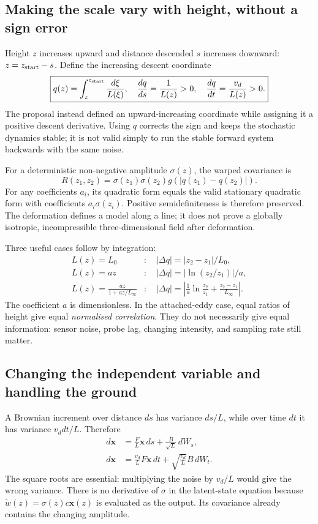 \documentclass[11pt,a4paper]{article}
\numberwithin{equation}{section}
\begin{document}
\subsection{Making the scale vary with height, without a sign error}
Height $z$ increases upward and distance descended $s$ increases downward: $z=z_{\rm start}-s$. Define the increasing descent coordinate
\begin{equation}
 \boxed{q(z)=\int_z^{z_{\rm start}}\frac{d\xi}{L(\xi)},\quad
 \frac{dq}{ds}=\frac1{L(z)}>0,\quad \frac{dq}{dt}=\frac{v_d}{L(z)}>0.}
\end{equation}
The proposal instead defined an upward-increasing coordinate while assigning it a positive descent derivative. Using $q$ corrects the sign and keeps the stochastic dynamics stable; it is not valid simply to run the stable forward system backwards with the same noise.

For a deterministic non-negative amplitude $\sigma(z)$, the warped covariance is
\begin{equation}
 R(z_1,z_2)=\sigma(z_1)\sigma(z_2)g(|q(z_1)-q(z_2)|).
\end{equation}
For any coefficients $a_i$, its quadratic form equals the valid stationary quadratic form with coefficients $a_i\sigma(z_i)$. Positive semidefiniteness is therefore preserved. The deformation defines a model along a line; it does not prove a globally isotropic, incompressible three-dimensional field after deformation.

Three useful cases follow by integration:
\begin{align}
 L(z)=L_0 &: \quad |\Delta q|=|z_2-z_1|/L_0,\\
 L(z)=az &: \quad |\Delta q|=|\ln(z_2/z_1)|/a,\\
 L(z)=\frac{az}{1+az/L_\infty} &: \quad |\Delta q|=
 \left|\frac1a\ln\frac{z_2}{z_1}+\frac{z_2-z_1}{L_\infty}\right|.
\end{align}
The coefficient $a$ is dimensionless. In the attached-eddy case, equal ratios of height give equal \emph{normalised correlation}. They do not necessarily give equal information: sensor noise, probe lag, changing intensity, and sampling rate still matter.

\subsection{Changing the independent variable and handling the ground}
A Brownian increment over distance $ds$ has variance $ds/L$, while over time $dt$ it has variance $v_d dt/L$. Therefore
\begin{align}
 d\mathbf x&=\frac FL\mathbf x\,ds+\frac B{\sqrt L}\,dW_s,\\
 d\mathbf x&=\frac{v_d}{L}F\mathbf x\,dt+\sqrt{\frac{v_d}{L}}B\,dW_t.
\end{align}
The square roots are essential: multiplying the noise by $v_d/L$ would give the wrong variance. There is no derivative of $\sigma$ in the latent-state equation because $\widetilde w(z)=\sigma(z)c\mathbf x(z)$ is evaluated as the output. Its covariance already contains the changing amplitude.
\end{document}
